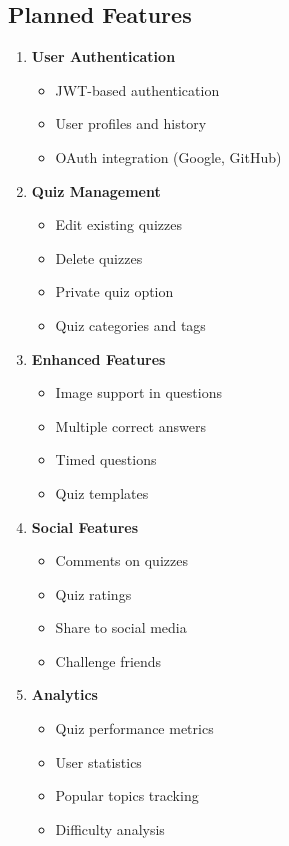 \documentclass[12pt,a4paper]{article}
\begin{document}
\subsection{Planned Features}
\begin{enumerate}
    \item \textbf{User Authentication}
    \begin{itemize}
        \item JWT-based authentication
        \item User profiles and history
        \item OAuth integration (Google, GitHub)
    \end{itemize}
    
    \item \textbf{Quiz Management}
    \begin{itemize}
        \item Edit existing quizzes
        \item Delete quizzes
        \item Private quiz option
        \item Quiz categories and tags
    \end{itemize}
    
    \item \textbf{Enhanced Features}
    \begin{itemize}
        \item Image support in questions
        \item Multiple correct answers
        \item Timed questions
        \item Quiz templates
    \end{itemize}
    
    \item \textbf{Social Features}
    \begin{itemize}
        \item Comments on quizzes
        \item Quiz ratings
        \item Share to social media
        \item Challenge friends
    \end{itemize}
    
    \item \textbf{Analytics}
    \begin{itemize}
        \item Quiz performance metrics
        \item User statistics
        \item Popular topics tracking
        \item Difficulty analysis
    \end{itemize}
\end{enumerate}
\end{document}

